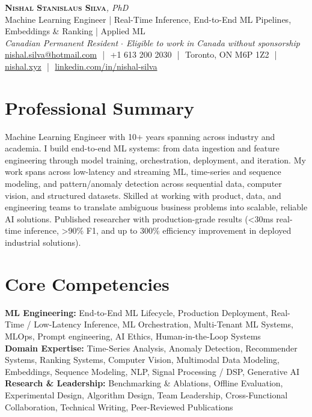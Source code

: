 \documentclass[11pt]{article}
\begin{document}
\pagestyle{empty}
\begin{center}
    {\LARGE \scshape \textbf{Nishal Stanislaus Silva}}{\large \textit{, PhD}}
    \\[1pt]
    {\small Machine Learning Engineer | Real-Time Inference, End-to-End ML Pipelines, Embeddings \& Ranking | Applied ML}
    \\[1pt]
    {\footnotesize\textit{Canadian Permanent Resident $\cdot$ Eligible to work in Canada without sponsorship}}
    \\[1pt]
    {\small \href{mailto:nishal.silva@hotmail.com}{nishal.silva@hotmail.com}
    \,\,|\,\, +1 613 200 2030
    \,\,|\,\, Toronto, ON M6P 1Z2
    \,\,|\,\, \href{https://nishal.xyz}{nishal.xyz}
    \,\,|\,\, \href{https://www.linkedin.com/in/nishal-silva}{linkedin.com/in/nishal-silva}}
\end{center}

\section*{Professional Summary}
Machine Learning Engineer with 10+ years spanning across industry and academia. I build end-to-end ML systems: from data ingestion and feature engineering through model training, orchestration, deployment, and iteration. My work spans across low-latency and streaming ML, time-series and sequence modeling, and pattern/anomaly detection across sequential data, computer vision, and structured datasets. Skilled at working with product, data, and engineering teams to translate ambiguous business problems into scalable, reliable AI solutions. Published researcher with production-grade results (<30ms real-time inference, >90\% F1, and up to 300\% efficiency improvement in deployed industrial solutions).

\section*{Core Competencies}
\textbf{ML Engineering:} End-to-End ML Lifecycle, Production Deployment, Real-Time / Low-Latency Inference, ML Orchestration, Multi-Tenant ML Systems, MLOps, Prompt engineering, AI Ethics, Human-in-the-Loop Systems\\
\textbf{Domain Expertise:} Time-Series Analysis, Anomaly Detection, Recommender Systems, Ranking Systems, Computer Vision, Multimodal Data Modeling, Embeddings, Sequence Modeling, NLP, Signal Processing / DSP, Generative AI\\
\textbf{Research \& Leadership:} Benchmarking \& Ablations, Offline Evaluation, Experimental Design, Algorithm Design, Team Leadership, Cross-Functional Collaboration, Technical Writing, Peer-Reviewed Publications
\end{document}
